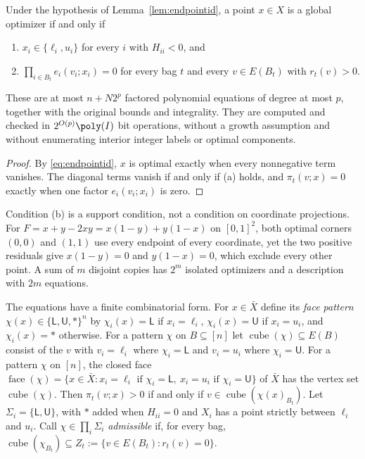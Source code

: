 \begin{theorem}\label{thm:endpointset}
Under the hypothesis of Lemma~\ref{lem:endpointid}, a point $x\in X$ is a
global optimizer if and only if
\begin{enumerate}
\item[(a)] $x_i\in\{\ell_i,u_i\}$ for every $i$ with $H_{ii}<0$, and
\item[(b)] $\prod_{i\in B_t}e_i(v_i;x_i)=0$ for every bag $t$ and every
$v\in E(B_t)$ with $r_t(v)>0$.
\end{enumerate}
These are at most $n+N2^p$ factored polynomial equations of degree at most
$p$, together with the original bounds and integrality. They are computed and
checked in $2^{O(p)}\poly(I)$ bit operations, without a growth assumption and
without enumerating interior integer labels or optimal components.
\end{theorem}

\begin{proof}
By \eqref{eq:endpointid}, $x$ is optimal exactly when every nonnegative term
vanishes. The diagonal terms vanish if and only if (a) holds, and
$\pi_t(v;x)=0$ exactly when one factor $e_i(v_i;x_i)$ is zero.
\end{proof}

Condition (b) is a support condition, not a condition on coordinate
projections. For $F=x+y-2xy=x(1-y)+y(1-x)$ on $[0,1]^2$, both optimal
corners $(0,0)$ and $(1,1)$ use every endpoint of every coordinate, yet the
two positive residuals give $x(1-y)=0$ and $y(1-x)=0$, which exclude every
other point. A sum of $m$ disjoint copies has $2^m$ isolated optimizers and
a description with $2m$ equations.

The equations have a finite combinatorial form. For $x\in\bar X$ define its
\emph{face pattern} $\chi(x)\in\{\mathsf L,\mathsf U,\ast\}^n$ by
$\chi_i(x)=\mathsf L$ if $x_i=\ell_i$, $\chi_i(x)=\mathsf U$ if $x_i=u_i$, and
$\chi_i(x)=\ast$ otherwise. For a pattern $\chi$ on $B\subseteq[n]$ let
$\operatorname{cube}(\chi)\subseteq E(B)$ consist of the $v$ with $v_i=\ell_i$
where $\chi_i=\mathsf L$ and $v_i=u_i$ where $\chi_i=\mathsf U$. For a
pattern $\chi$ on $[n]$, the closed face
$\operatorname{face}(\chi)=\{x\in\bar X:x_i=\ell_i\text{ if }\chi_i=\mathsf L,\
x_i=u_i\text{ if }\chi_i=\mathsf U\}$ of $\bar X$ has the vertex set
$\operatorname{cube}(\chi)$. Then $\pi_t(v;x)>0$ if and only if
$v\in\operatorname{cube}(\chi(x)_{B_t})$. Let $\Sigma_i=\{\mathsf L,\mathsf U\}$,
with $\ast$ added when $H_{ii}=0$ and $X_i$ has a point strictly between
$\ell_i$ and $u_i$. Call $\chi\in\prod_i\Sigma_i$ \emph{admissible} if, for
every bag, $\operatorname{cube}(\chi_{B_t})\subseteq Z_t:=\{v\in E(B_t):r_t(v)=0\}$.

